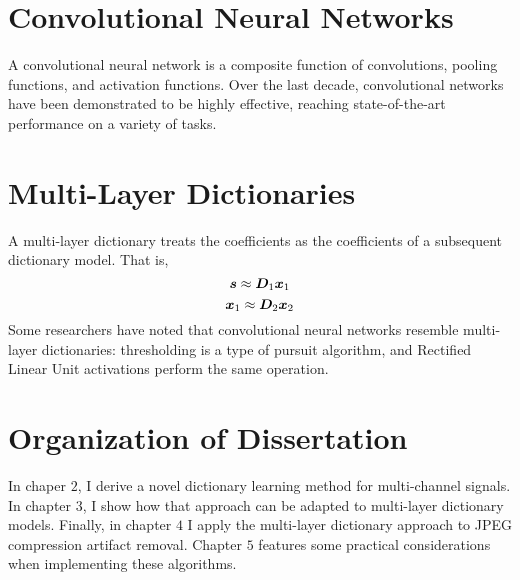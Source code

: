 \section{Convolutional Neural Networks}
A convolutional neural network is a composite function of convolutions, pooling functions, and activation functions. Over the last decade, convolutional networks have been demonstrated to be highly effective, reaching state-of-the-art performance on a variety of tasks.

\section{Multi-Layer Dictionaries}
A multi-layer dictionary treats the coefficients as the coefficients of a subsequent dictionary model. That is,
\begin{equation}
\bm{s} \approx \bm{D}_1\bm{x}_1
\end{equation}
\begin{equation}
\bm{x}_1 \approx \bm{D}_2\bm{x}_2
\end{equation}
Some researchers have noted that convolutional neural networks resemble multi-layer dictionaries: thresholding is a type of pursuit algorithm, and Rectified Linear Unit activations perform the same operation.


\section{Organization of Dissertation}
In chaper $2$, I derive a novel dictionary learning method for multi-channel signals. In chapter $3$, I show how that approach can be adapted to multi-layer dictionary models.  Finally, in chapter $4$ I apply the multi-layer dictionary approach to JPEG compression artifact removal. Chapter $5$ features some practical considerations when implementing these algorithms.




